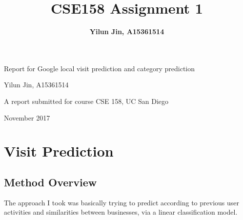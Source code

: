 \documentclass{article}
\title{\bf CSE158 Assignment 1}
\author{\bf Yilun Jin, A15361514}
\begin{document}
\thispagestyle{empty}
\begin{center}
\begin{minipage}{0.75\linewidth}
    \centering


	\vspace{4cm}
    {{\LARGE Report for Google local visit prediction and category prediction\par}}
    \vspace{4cm}
    {\Large Yilun Jin, A15361514\par}
    \vspace{4cm}
    {\Large A report submitted for course CSE 158, UC San Diego\par}
    \vspace{4cm}
    {\Large November 2017}
\end{minipage}
\end{center}
\clearpage


\section{Visit Prediction}
\subsection{Method Overview}
The approach I took was basically trying to predict according to previous user activities and similarities between businesses, via a linear classification model. 
\end{document}
